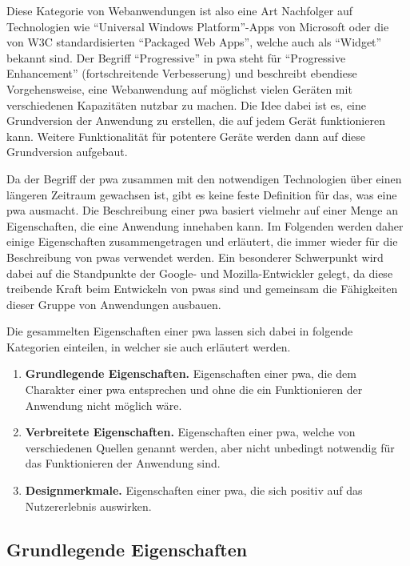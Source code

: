 \documentclass[12pt, parskip=half]{scrartcl}       %
\newcommand\litem[1]{\item{\bfseries#1.\space}}
\begin{document}
Diese Kategorie von Webanwendungen ist also eine Art Nachfolger auf Technologien wie \enquote{Universal Windows Platform}-Apps\cite{msdocs_uwp} von Microsoft oder die von W3C standardisierten \enquote{Packaged Web Apps}\cite{w3c_packagedwebapps}, welche auch als \enquote{Widget} bekannt sind.
Der Begriff \enquote{Progressive} in \acl{pwa} steht für \enquote{Progressive Enhancement} (fortschreitende Verbesserung) und beschreibt ebendiese Vorgehensweise, eine Webanwendung auf möglichst vielen Geräten mit verschiedenen Kapazitäten nutzbar zu machen.
Die Idee dabei ist es, eine Grundversion der Anwendung zu erstellen, die auf jedem Gerät funktionieren kann.
Weitere Funktionalität für potentere Geräte werden dann auf diese Grundversion aufgebaut.

Da der Begriff der \ac{pwa} zusammen mit den notwendigen Technologien über einen längeren Zeitraum gewachsen ist, gibt es keine feste Definition für das, was eine \ac{pwa} ausmacht.
Die Beschreibung einer \ac{pwa} basiert vielmehr auf einer Menge an Eigenschaften, die eine Anwendung innehaben kann.
Im Folgenden werden daher einige Eigenschaften zusammengetragen und erläutert, die immer wieder für die Beschreibung von \acp{pwa} verwendet werden.
Ein besonderer Schwerpunkt wird dabei auf die Standpunkte der Google- und Mozilla-Entwickler gelegt, da diese treibende Kraft beim Entwickeln von \acp{pwa} sind und gemeinsam die Fähigkeiten dieser Gruppe von Anwendungen ausbauen.

\newpage %

Die gesammelten Eigenschaften einer \ac{pwa} lassen sich dabei in folgende Kategorien einteilen, in welcher sie auch erläutert werden.

\begin{enumerate}
  \litem{Grundlegende Eigenschaften} Eigenschaften einer \ac{pwa}, die dem Charakter einer \ac{pwa} entsprechen und ohne die ein Funktionieren der Anwendung nicht möglich wäre.

  \litem{Verbreitete Eigenschaften} Eigenschaften einer \ac{pwa}, welche von verschiedenen Quellen genannt werden, aber nicht unbedingt notwendig für das Funktionieren der Anwendung sind.

  \litem{Designmerkmale} Eigenschaften einer \ac{pwa}, die sich positiv auf das Nutzererlebnis auswirken.
\end{enumerate}


\subsection{Grundlegende Eigenschaften}
\end{document}
